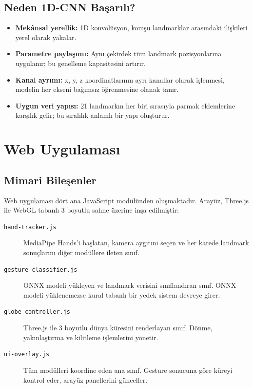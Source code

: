 \documentclass[12pt,a4paper]{article}
\begin{document}
\subsection{Neden 1D-CNN Başarılı?}

\begin{itemize}
    \item \textbf{Mekânsal yerellik:} 1D konvolüsyon, komşu landmarklar arasındaki ilişkileri yerel olarak yakalar.
    \item \textbf{Parametre paylaşımı:} Aynı çekirdek tüm landmark pozisyonlarına uygulanır; bu genelleme kapasitesini artırır.
    \item \textbf{Kanal ayrımı:} x, y, z koordinatlarının ayrı kanallar olarak işlenmesi, modelin her ekseni bağımsız öğrenmesine olanak tanır.
    \item \textbf{Uygun veri yapısı:} 21 landmarkın her biri sırasıyla parmak eklemlerine karşılık gelir; bu sıralılık anlamlı bir yapı oluşturur.
\end{itemize}

\section{Web Uygulaması}

\subsection{Mimari Bileşenler}

Web uygulaması dört ana JavaScript modülünden oluşmaktadır. Arayüz, Three.js \cite{threejs} ile WebGL tabanlı 3 boyutlu sahne üzerine inşa edilmiştir:

\begin{description}
    \item[\texttt{hand-tracker.js}] MediaPipe Hands'i başlatan, kamera aygıtını seçen ve her karede landmark sonuçlarını diğer modüllere ileten sınıf.
    \item[\texttt{gesture-classifier.js}] ONNX modeli yükleyen ve landmark verisini sınıflandıran sınıf. ONNX modeli yüklenemezse kural tabanlı bir yedek sistem devreye girer.
    \item[\texttt{globe-controller.js}] Three.js ile 3 boyutlu dünya küresini renderlayan sınıf. Dönme, yakınlaştırma ve kilitleme işlemlerini yönetir.
    \item[\texttt{ui-overlay.js}] Tüm modülleri koordine eden ana sınıf. Gesture sonucuna göre küreyi kontrol eder, arayüz panellerini günceller.
\end{description}
\end{document}
